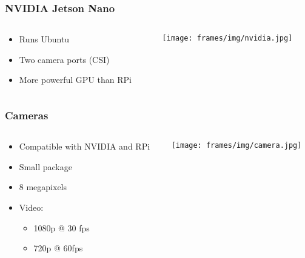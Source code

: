 \begin{frame}
    \frametitle{NVIDIA Jetson Nano}
    \begin{columns}
        \begin{column}[]{0.5\textwidth}
            \begin{itemize}
                \item Runs Ubuntu
                \item Two camera ports (CSI)
                \item More powerful GPU than RPi
            \end{itemize}
        \end{column}

        \begin{column}[]{0.5\textwidth}
            \texttt{[image: frames/img/nvidia.jpg]}
        \end{column}
    \end{columns}


\end{frame}

\begin{frame}
    \frametitle{Cameras}
    \begin{columns}
        \begin{column}[]{0.5\textwidth}
            \begin{itemize}
                \item Compatible with NVIDIA and RPi
                \item Small package
                \item 8 megapixels
                \item Video:
                \begin{itemize}
                    \item 1080p @ 30 fps
                    \item 720p @ 60fps
                \end{itemize}

            \end{itemize}
        \end{column}

        \begin{column}[]{0.5\textwidth}
            \texttt{[image: frames/img/camera.jpg]}
        \end{column}
    \end{columns}
\end{frame}


